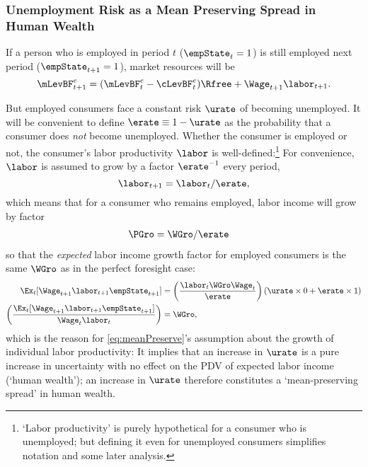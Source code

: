 \documentclass{\handout}
\begin{document}
\subsubsection{Unemployment Risk as a Mean Preserving Spread in Human Wealth} \label{subsubsec:uMPS}
If a person who is employed in period $t$ ($\empState_{t}=1$) is still employed next
period ($\empState_{t+1}=1$), market resources will be
\begin{equation}
\mLevBF^{e}_{t+1} = (\mLevBF^{e}_{t}-\cLevBF^{e}_{t})\Rfree+\Wage_{t+1}\labor_{t+1}. \label{eq:Metp1}
\end{equation}

But employed consumers face a constant risk $\urate$ of becoming unemployed.  
It will be convenient to define $\erate\equiv 1-\urate$ as the probability that a consumer does {\it not} become unemployed.  Whether the consumer is employed or not, the consumer's labor productivity $\labor$ is well-defined:\footnote{`Labor productivity' is purely hypothetical for a consumer who is unemployed; but defining it even for unemployed consumers simplifies notation and some later analysis.}  For convenience, $\labor$ is assumed to grow by a factor $\erate^{-1}$ every period,
\begin{equation}
\labor_{t+1} =    \labor_{t}/\erate \label{eq:meanPreserve},
\end{equation}
which means that for a consumer who remains employed, labor income will grow by factor
\begin{equation}\begin{gathered}\begin{aligned}
  \PGro & =  \WGro/\erate
\end{aligned}\end{gathered}\end{equation}
so that the {\it expected} labor income growth factor for
employed consumers is the same $\WGro$ as in the perfect foresight case:
\begin{equation*}\begin{gathered}\begin{aligned}
  \Ex_{t}[\Wage_{t+1}\labor_{t+1}\empState_{t+1}] & =   \left(\frac{\labor_{t} \WGro \Wage_{t}}{\erate}\right)\left(\urate \times 0 + \erate \times 1 \right)
\\ \left(\frac{\Ex_{t}[\Wage_{t+1}\labor_{t+1}\empState_{t+1}]}{\Wage_{t} \labor_{t}}\right) &  =  \WGro
,
\end{aligned}\end{gathered}\end{equation*}
which is  the reason for \eqref{eq:meanPreserve}'s assumption about the growth of
individual labor productivity: It implies
that an increase in $\urate$ is a pure increase in uncertainty with no
effect on the PDV of expected labor income (`human wealth'); an increase in $\urate$ therefore constitutes a `mean-preserving spread' in human wealth.
\end{document}
